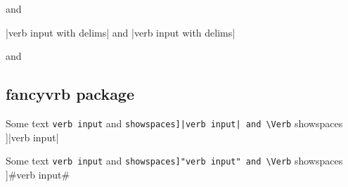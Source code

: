 \documentclass[a4paper]{article}
\begin{document}
 and  %

\mytextinline|verb input with delims| and \mytextinline[%
showspaces=false
]|verb input with delims|

 and 

\subsection{fancyvrb package}

Some text \Verb|verb input| and %
\Verb[showspaces]|verb input| and \Verb[
showspaces
]|verb input|

Some text \Verb!verb input! and %
\Verb[showspaces]"verb input" and \Verb[
showspaces
]#verb input#
\end{document}
